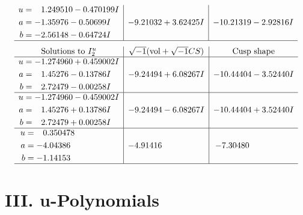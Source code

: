 \documentclass[1p]{elsarticle_modified}
\theoremstyle{definition}
\newcommand{\I}{\sqrt{-1}}
\begin{document}
$$\begin{array}{c|c|c}
\begin{aligned}
u &= \phantom{-}1.249510 - 0.470199 I \\
a &= -1.35976 - 0.50699 I \\
b &= -2.56148 - 0.64724 I\end{aligned}
 & -9.21032 + 3.62425 I & -10.21319 - 2.92816 I\\
 \hline 
 \end{array}$$\newpage$$\begin{array}{c|c|c}  
\text{Solutions to }I^u_{2}& \I (\text{vol} + \sqrt{-1}CS) & \text{Cusp shape}\\
 \hline 
\begin{aligned}
u &= -1.274960 + 0.459002 I \\
a &= \phantom{-}1.45276 - 0.13786 I \\
b &= \phantom{-}2.72479 - 0.00258 I\end{aligned}
 & -9.24494 + 6.08267 I & -10.44404 - 3.52440 I \\ \hline\begin{aligned}
u &= -1.274960 - 0.459002 I \\
a &= \phantom{-}1.45276 + 0.13786 I \\
b &= \phantom{-}2.72479 + 0.00258 I\end{aligned}
 & -9.24494 - 6.08267 I & -10.44404 + 3.52440 I \\ \hline\begin{aligned}
u &= \phantom{-}0.350478\phantom{ +0.000000I} \\
a &= -4.04386\phantom{ +0.000000I} \\
b &= -1.14153\phantom{ +0.000000I}\end{aligned}
 & -4.91416\phantom{ +0.000000I} & -7.30480\phantom{ +0.000000I}\\
 \hline 
 \end{array}$$\newpage
\newpage\renewcommand{\arraystretch}{1}
\centering \section*{ III. u-Polynomials}
\end{document}
